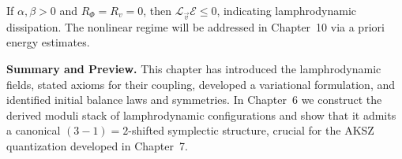 \begin{remark}
If $\alpha,\beta>0$ and $R_{\Phi}=R_{v}=0$, then
$\mathcal{L}_{\vec v}\mathcal{E}\le 0$, indicating lamphrodynamic
dissipation. The nonlinear regime will be addressed in Chapter~10 via
a priori energy estimates.
\end{remark}

\medskip

\noindent\textbf{Summary and Preview.}
This chapter has introduced the lamphrodynamic fields, stated axioms for
their coupling, developed a variational formulation, and identified
initial balance laws and symmetries. In Chapter~6 we construct the
derived moduli stack of lamphrodynamic configurations and show that it
admits a canonical $(3-1)=2$-shifted symplectic structure,
crucial for the AKSZ quantization developed in Chapter~7.

